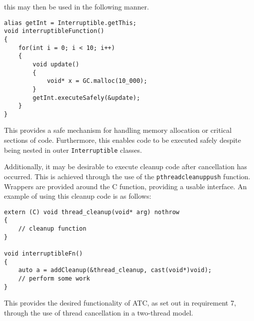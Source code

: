 this may then be used in the following manner. 
\begin{lstlisting}[basicstyle=\small]
alias getInt = Interruptible.getThis;
void interruptibleFunction() 
{
    for(int i = 0; i < 10; i++)
    {
        void update() 
        {
            void* x = GC.malloc(10_000); 
        }
        getInt.executeSafely(&update);
    }
}
\end{lstlisting}
This provides a safe mechanism for handling memory allocation or critical sections 
of code. Furthermore, this enables code to be executed safely despite being 
nested in outer \texttt{Interruptible} classes. 
\par\bigskip\noindent
Additionally, it may be desirable to execute cleanup code after cancellation 
has occurred. This is achieved through the use of the 
\texttt{pthread\textunderscore{}cleanup\textunderscore{}push} function. 
Wrappers are provided around the C function, providing a usable interface. An 
example of using this cleanup code is as follows: 
\begin{lstlisting}[basicstyle=\small]
extern (C) void thread_cleanup(void* arg) nothrow
{
    // cleanup function
}

void interruptibleFn()
{
    auto a = addCleanup(&thread_cleanup, cast(void*)void);
    // perform some work
}
\end{lstlisting}
This provides the desired functionality of ATC, as set out in requirement 7, 
through the use of thread cancellation in a two-thread model.

